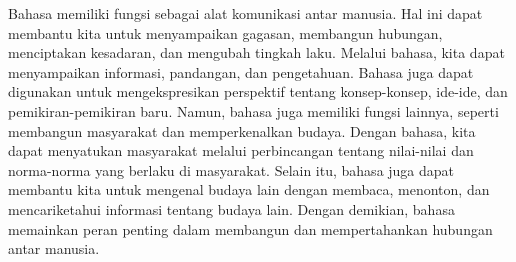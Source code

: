 \documentclass[
	10pt, %
	indonesian
]{assignment}
\begin{document}
\-\hspace{0.5cm} Bahasa memiliki fungsi sebagai alat komunikasi antar manusia.
Hal ini dapat membantu kita untuk menyampaikan gagasan, membangun hubungan, menciptakan kesadaran, dan mengubah tingkah laku.
Melalui bahasa, kita dapat menyampaikan informasi, pandangan, dan pengetahuan.
Bahasa juga dapat digunakan untuk mengekspresikan perspektif tentang konsep-konsep, ide-ide, dan pemikiran-pemikiran baru.
Namun, bahasa juga memiliki fungsi lainnya, seperti membangun masyarakat dan memperkenalkan budaya.
Dengan bahasa, kita dapat menyatukan masyarakat melalui perbincangan tentang nilai-nilai dan norma-norma yang berlaku di masyarakat.
Selain itu, bahasa juga dapat membantu kita untuk mengenal budaya lain dengan membaca, menonton, dan mencariketahui informasi tentang budaya lain.
Dengan demikian, bahasa memainkan peran penting dalam membangun dan mempertahankan hubungan antar manusia.


\end{document}
